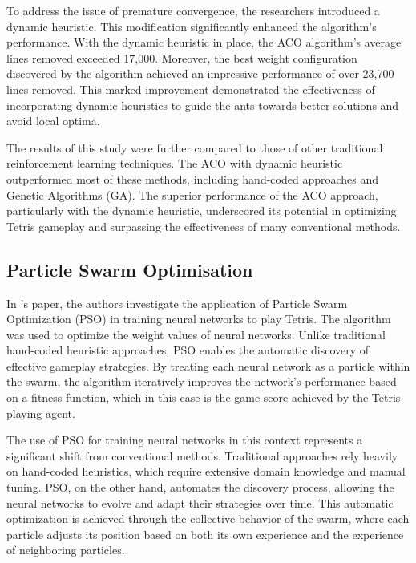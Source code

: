 \documentclass[a4paper, 12pt]{extreport}
\begin{document}
				To address the issue of premature convergence, the researchers introduced a dynamic heuristic. This modification significantly enhanced the algorithm's performance. With the dynamic heuristic in place, the ACO algorithm's average lines removed exceeded 17,000. Moreover, the best weight configuration discovered by the algorithm achieved an impressive performance of over 23,700 lines removed. This marked improvement demonstrated the effectiveness of incorporating dynamic heuristics to guide the ants towards better solutions and avoid local optima.
				
				The results of this study were further compared to those of other traditional reinforcement learning techniques. The ACO with dynamic heuristic outperformed most of these methods, including hand-coded approaches and Genetic Algorithms (GA). The superior performance of the ACO approach, particularly with the dynamic heuristic, underscored its potential in optimizing Tetris gameplay and surpassing the effectiveness of many conventional methods.
				
			\subsection{Particle Swarm Optimisation}
			
				In \citeauthor{swarm-tetris}'s \cite{swarm-tetris} paper, the authors investigate the application of Particle Swarm Optimization (PSO) in training neural networks to play Tetris. The algorithm was used to optimize the weight values of neural networks. Unlike traditional hand-coded heuristic approaches, PSO enables the automatic discovery of effective gameplay strategies. By treating each neural network as a particle within the swarm, the algorithm iteratively improves the network's performance based on a fitness function, which in this case is the game score achieved by the Tetris-playing agent.
				
				The use of PSO for training neural networks in this context represents a significant shift from conventional methods. Traditional approaches rely heavily on hand-coded heuristics, which require extensive domain knowledge and manual tuning. PSO, on the other hand, automates the discovery process, allowing the neural networks to evolve and adapt their strategies over time. This automatic optimization is achieved through the collective behavior of the swarm, where each particle adjusts its position based on both its own experience and the experience of neighboring particles.
				
\end{document}
